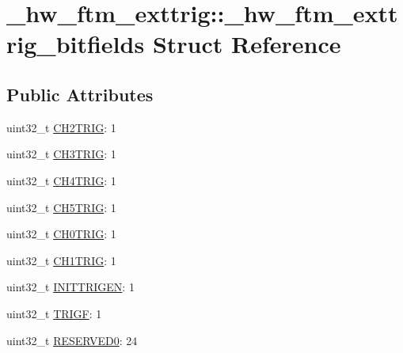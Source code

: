 \hypertarget{struct__hw__ftm__exttrig_1_1__hw__ftm__exttrig__bitfields}{}\section{\+\_\+hw\+\_\+ftm\+\_\+exttrig\+:\+:\+\_\+hw\+\_\+ftm\+\_\+exttrig\+\_\+bitfields Struct Reference}
\label{struct__hw__ftm__exttrig_1_1__hw__ftm__exttrig__bitfields}
\subsection*{Public Attributes}
\begin{DoxyCompactItemize}
\item 
uint32\+\_\+t \hyperlink{struct__hw__ftm__exttrig_1_1__hw__ftm__exttrig__bitfields_a8e6489c99849633b8f3408aba7f4c9d5}{C\+H2\+T\+R\+IG}\+: 1
\item 
uint32\+\_\+t \hyperlink{struct__hw__ftm__exttrig_1_1__hw__ftm__exttrig__bitfields_aed50c423e451df892cfff8c86095930a}{C\+H3\+T\+R\+IG}\+: 1
\item 
uint32\+\_\+t \hyperlink{struct__hw__ftm__exttrig_1_1__hw__ftm__exttrig__bitfields_a507bf4e194e146b754da75f94d181022}{C\+H4\+T\+R\+IG}\+: 1
\item 
uint32\+\_\+t \hyperlink{struct__hw__ftm__exttrig_1_1__hw__ftm__exttrig__bitfields_ad6bd80d05a08eed290919ad00bb80d0d}{C\+H5\+T\+R\+IG}\+: 1
\item 
uint32\+\_\+t \hyperlink{struct__hw__ftm__exttrig_1_1__hw__ftm__exttrig__bitfields_a9ef691dc1ff302b667d27459767a8809}{C\+H0\+T\+R\+IG}\+: 1
\item 
uint32\+\_\+t \hyperlink{struct__hw__ftm__exttrig_1_1__hw__ftm__exttrig__bitfields_af6ac3d0c032723ce27b26154cf3fac9d}{C\+H1\+T\+R\+IG}\+: 1
\item 
uint32\+\_\+t \hyperlink{struct__hw__ftm__exttrig_1_1__hw__ftm__exttrig__bitfields_ad04d0474462d128e540cac4806947f34}{I\+N\+I\+T\+T\+R\+I\+G\+EN}\+: 1
\item 
uint32\+\_\+t \hyperlink{struct__hw__ftm__exttrig_1_1__hw__ftm__exttrig__bitfields_aa884d45271bbd320abb15bad26f2adaf}{T\+R\+I\+GF}\+: 1
\item 
uint32\+\_\+t \hyperlink{struct__hw__ftm__exttrig_1_1__hw__ftm__exttrig__bitfields_ade8f1832152de66f8e46db125609a924}{R\+E\+S\+E\+R\+V\+E\+D0}\+: 24
\end{DoxyCompactItemize}


